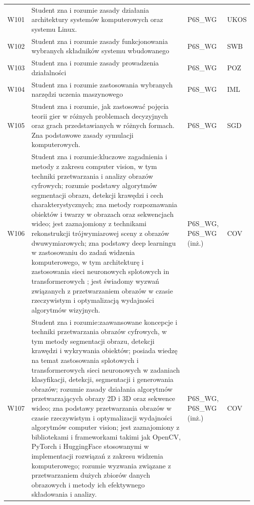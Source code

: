 \documentclass[12pt,a4paper]{article}
\begin{document}
{\begin{longtable}{m{1cm}m{8.8cm}m{2.1cm}m{2.5cm}}
\rowcolor{tableRowLight} W101 & Student zna i rozumie zasady działania architektury systemów komputerowych oraz systemu Linux. & {\scriptsize P6S\_WG} & {\scriptsize UKOS} \\
\rowcolor{tableRowAlt} W102 & Student zna i rozumie zasady funkcjonowania wybranych składników systemu wbudowanego & {\scriptsize P6S\_WG} & {\scriptsize SWB} \\
\rowcolor{tableRowLight} W103 & Student zna i rozumie zasady prowadzenia działalności & {\scriptsize P6S\_WG} & {\scriptsize POZ} \\
\rowcolor{tableRowAlt} W104 & Student zna i rozumie zastosowania wybranych narzędzi uczenia maszynowego & {\scriptsize P6S\_WG} & {\scriptsize IML} \\
\rowcolor{tableRowLight} W105 & Student zna i rozumie, jak zastosować pojęcia teorii gier w różnych problemach decyzyjnych oraz grach przedstawianych w różnych formach. Zna podstawowe zasady symulacji komputerowych. & {\scriptsize P6S\_WG} & {\scriptsize SGD} \\
\rowcolor{tableRowAlt} W106 & Student zna i rozumie:kluczowe zagadnienia i metody z zakresu computer vision, w tym techniki przetwarzania i analizy obrazów cyfrowych; rozumie podstawy algorytmów segmentacji obrazu, detekcji krawędzi i cech charakterystycznych; zna metody rozpoznawania obiektów i twarzy w obrazach oraz sekwencjach wideo; jest zaznajomiony z technikami rekonstrukcji trójwymiarowej sceny z obrazów dwuwymiarowych; zna podstawy deep learningu w zastosowaniu do zadań widzenia komputerowego, w tym architekturę i zastosowania sieci neuronowych splotowych in transformerowych ; jest świadomy wyzwań związanych z przetwarzaniem obrazów w czasie rzeczywistym i optymalizacją wydajności algorytmów wizyjnych. & {\scriptsize P6S\_WG, P6S\_WG {\scriptsize (inż.)}} & {\scriptsize COV} \\
\rowcolor{tableRowLight} W107 & Student zna i rozumie:zaawansowane koncepcje i techniki przetwarzania obrazów cyfrowych, w tym metody segmentacji obrazu, detekcji krawędzi i wykrywania obiektów; posiada wiedzę na temat zastosowania splotowych i transformerowych sieci neuronowych w zadaniach klasyfikacji, detekcji, segmentacji i generowania obrazów; rozumie zasady działania algorytmów przetwarzających obrazy 2D i 3D oraz sekwence wideo; zna podstawy przetwarzania obrazów w czasie rzeczywistym i optymalizacji wydajności algorytmów computer vision; jest zaznajomiony z bibliotekami i frameworkami takimi jak OpenCV, PyTorch i HuggingFace stosowanymi w implementacji rozwiązań z zakresu widzenia komputerowego; rozumie wyzwania związane z przetwarzaniem dużych zbiorów danych obrazowych i metody ich efektywnego składowania i analizy. & {\scriptsize P6S\_WG, P6S\_WG {\scriptsize (inż.)}} & {\scriptsize COV} \\

\end{longtable}}
\end{document}
